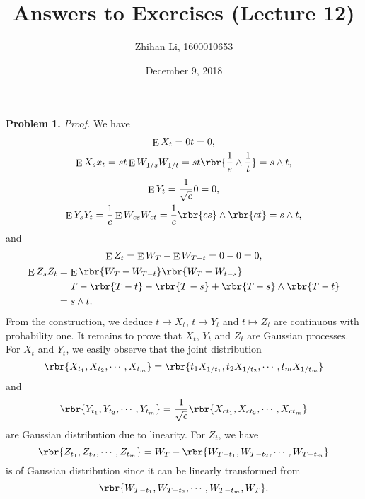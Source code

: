 \documentclass[english, nochinese]{pnote}
\title{Answers to Exercises (Lecture 12)}
\author{Zhihan Li, 1600010653}
\date{December 9, 2018}
\DeclareMathOperator\ope{\mathrm{E}}
\begin{document}
\maketitle

\textbf{Problem 1.} \textit{Proof.} We have
\begin{gather}
\ope X_t = 0 t = 0, \\
\ope X_s x_t = s t \ope W_{ 1 / s } W_{ 1 / t } = s t \rbr{ \frac{1}{s} \wedge \frac{1}{t} } = s \wedge t,
\end{gather}
\begin{gather}
\ope Y_t = \frac{1}{\sqrt{c}} 0 = 0, \\
\ope Y_s Y_t = \frac{1}{c} \ope W_{ c s } W_{ c t } = \frac{1}{c} \rbr{ c s } \wedge \rbr{ c t } = s \wedge t,
\end{gather}
and
\begin{gather}
\ope Z_t = \ope W_T - \ope W_{ T - t } = 0 - 0 = 0, \\
\begin{split}
\ope Z_s Z_t &= \ope \rbr{ W_T - W_{ T - t } } \rbr{ W_T - W_{ t - s } } \\
&= T - \rbr{ T - t } - \rbr{ T - s } + \rbr{ T - s } \wedge \rbr{ T - t } \\
&= s \wedge t.
\end{split}
\end{gather}
From the construction, we deduce $ t \mapsto X_t $, $ t \mapsto Y_t $ and $ t \mapsto Z_t $ are continuous with probability one. It remains to prove that $X_t$, $Y_t$ and $Z_t$ are Gaussian processes. For $X_t$ and $Y_t$, we easily observe that the joint distribution
\begin{equation}
\rbr{ X_{t_1}, X_{t_2}, \cdots, X_{t_m} } = \rbr{ t_1 X_{ 1 / t_1 }, t_2 X_{ 1 / t_2 }, \cdots, t_m X_{ 1 / t_m } }
\end{equation}
and
\begin{equation}
\rbr{ Y_{t_1}, Y_{t_2}, \cdots, Y_{t_m} } = \frac{1}{\sqrt{c}} \rbr{ X_{ c t_1 }, X_{ c t_2 }, \cdots, X_{ c t_m } }
\end{equation}
are Gaussian distribution due to linearity. For $Z_t$, we have
\begin{equation}
\rbr{ Z_{t_1}, Z_{t_2}, \cdots, Z_{t_m} } = W_T - \rbr{ W_{ T - t_1 }, W_{ T - t_2 }, \cdots, W_{ T - t_m } }
\end{equation}
is of Gaussian distribution since it can be linearly transformed from
\begin{equation}
\rbr{ W_{ T - t_1 }, W_{ T - t_2 }, \cdots, W_{ T - t_m }, W_T }.
\end{equation}
\end{document}
